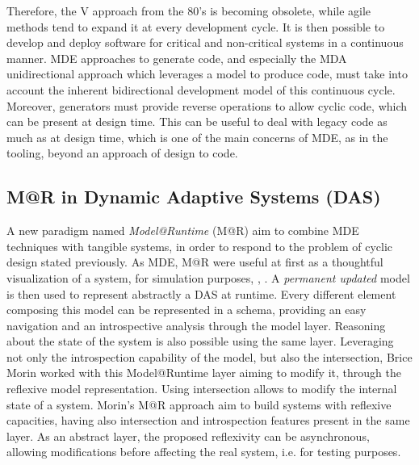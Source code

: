 Therefore, the V approach from the 80's is becoming obsolete, while agile methods tend to expand it at every development cycle.
It is then possible to develop and deploy software for critical and non-critical systems in a continuous manner.
MDE approaches to generate code, and especially the MDA unidirectional approach which leverages a model to produce code, must take into account the inherent bidirectional development model of this continuous cycle.
Moreover, generators must provide reverse operations to allow cyclic code, which can be present at design time.
This can be useful to deal with legacy code as much as at design time, which is one of the main concerns of MDE, as in the tooling, beyond an approach of design to code.

\subsection{M@R in Dynamic Adaptive Systems (DAS)}
A new paradigm named \textit{Model@Runtime} (M@R) aim to combine MDE techniques with tangible systems, in order to respond to the problem of cyclic design stated previously.
As MDE, M@R were useful at first as a thoughtful visualization of a system, for simulation purposes\cite{oreizy1999architecture}, \cite{blair2009models}, \cite{zhang2006model}.
A \textit{permanent updated} model is then used to represent abstractly a DAS at runtime.
Every different element composing this model can be represented in a schema, providing an easy navigation and an introspective analysis through the model layer.
Reasoning about the state of the system is also possible using the same layer.
Leveraging not only the introspection capability of the model, but also the intersection, Brice Morin\cite{morin2010leveraging} worked with this Model@Runtime layer aiming to modify it, through the reflexive model representation.
Using intersection allows to modify the internal state of a system\cite{paepcke1993object}.
Morin's M@R approach aim to build systems with reflexive capacities, having also intersection and introspection features present in the same layer.
As an abstract layer, the proposed reflexivity can be asynchronous, allowing modifications before affecting the real system, i.e. for testing purposes. 

